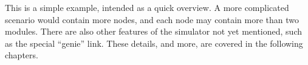 This is a simple example, intended as a quick overview.  A more
complicated scenario would contain more nodes, and each node may
contain more than two modules.  There are also other features of the
simulator not yet mentioned, such as the special ``genie'' link.
These details, and more, are covered in the following chapters.

%  
% 
% 
% 
% 
